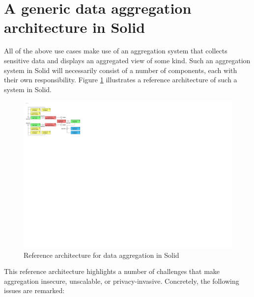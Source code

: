 \newpage

\section{A generic data aggregation architecture in Solid}
\label{sec:generic-agg-arch}
All of the above use cases make use of an aggregation system that collects sensitive data and displays an aggregated view of some kind. Such an aggregation system in Solid will necessarily consist of a number of components, each with their own responsibility. Figure \ref{fig:reference-architecture} illustrates a reference architecture of such a system in Solid. 

\begin{figure}[h]
    \centering
    \includegraphics[width=1.0\textwidth]{images/architecture/Reference-Architecture-Aggregator.pdf}
    \caption{Reference architecture for data aggregation in Solid}
    \label{fig:reference-architecture}
\end{figure}

\noindent This reference architecture highlights a number of challenges that make aggregation insecure, unscalable, or privacy-invasive. Concretely, the following issues are remarked:

